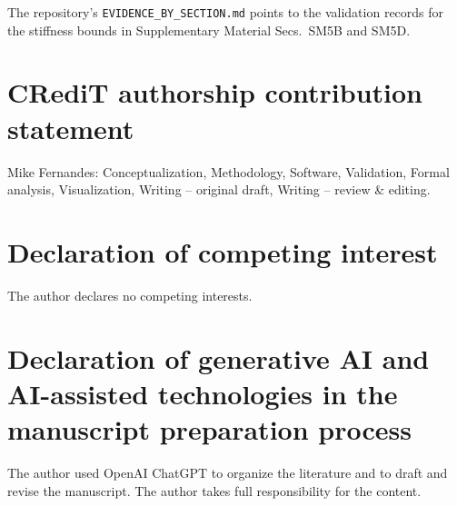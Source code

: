 \documentclass[10pt,aps,onecolumn,floatfix,notitlepage,nofootinbib,showkeys]{revtex4-2}
\begin{document}
The repository's \nolinkurl{EVIDENCE_BY_SECTION.md} points to the validation records for the stiffness bounds in Supplementary Material Secs.~SM5B and SM5D.

\section*{CRediT authorship contribution statement}
Mike Fernandes: Conceptualization, Methodology, Software, Validation, Formal analysis, Visualization, Writing -- original draft, Writing -- review \& editing.

\section*{Declaration of competing interest}
The author declares no competing interests.

\section*{Declaration of generative AI and AI-assisted technologies in the manuscript preparation process}
The author used OpenAI ChatGPT to organize the literature and to draft and revise the manuscript. The author takes full responsibility for the content.
\end{document}
